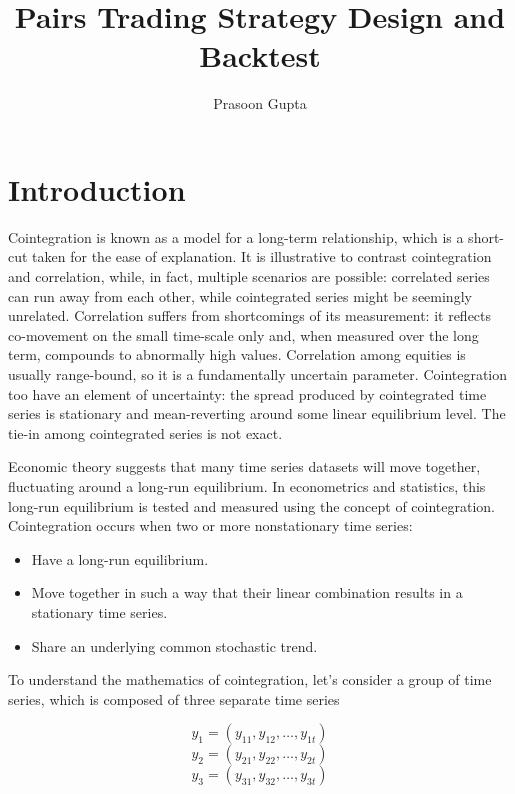 \documentclass[a4paper, 11pt]{article}
\title{Pairs Trading Strategy Design and Backtest}
\author{Prasoon Gupta}
\begin{document}
\maketitle

\pagebreak

\tableofcontents

\pagebreak

\section{Introduction}
Cointegration is known as a model for a long-term relationship, which is a short-cut taken for the ease of explanation. It is illustrative to contrast cointegration and correlation, while, in fact, multiple scenarios are possible: correlated series can run away from each other, while cointegrated series might be seemingly unrelated. Correlation suffers from shortcomings of its measurement: it reflects co-movement on the small time-scale only and, when measured over the long term, compounds to abnormally high values. Correlation among equities is usually range-bound, so it is a fundamentally uncertain parameter. Cointegration too have an element of uncertainty: the spread produced by cointegrated time series is stationary and mean-reverting around some
linear equilibrium level. The tie-in among cointegrated series is not exact.

Economic theory suggests that many time series datasets will move together, fluctuating around a long-run equilibrium. In econometrics and statistics, this long-run equilibrium is tested and measured using the concept of cointegration.\\
Cointegration occurs when two or more nonstationary time series:

\begin{itemize}
\item Have a long-run equilibrium.
\item Move together in such a way that their linear combination results in a stationary time series.
\item Share an underlying common stochastic trend.
\end{itemize}

To understand the mathematics of cointegration, let's consider a group of time series, which is composed of three separate time series

$$y_1 = (y_{11}, y_{12}, \ldots, y_{1t})$$
$$y_2 = (y_{21}, y_{22}, \ldots, y_{2t})$$
$$y_3 = (y_{31}, y_{32}, \ldots, y_{3t})$$
\end{document}

